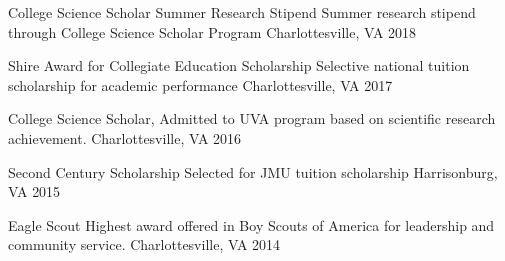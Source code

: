 \begin{cvhonors}
  \cvhonor
    { College Science Scholar Summer Research Stipend} %
    {Summer research stipend through College Science Scholar Program} %
    {Charlottesville, VA} %
    {2018} %
    
  \cvhonor
    {Shire Award for Collegiate Education Scholarship} %
    {Selective national tuition scholarship for academic performance} %
    {Charlottesville, VA} %
    {2017} %

  \cvhonor
    {College Science Scholar,} %
    {Admitted to UVA program based on scientific research achievement.} %
    {Charlottesville, VA} %
    {2016} %

  \cvhonor
    {Second Century Scholarship} %
    {Selected for JMU tuition scholarship} %
    {Harrisonburg, VA} %
    {2015} %
    
  \cvhonor
    {Eagle Scout} %
    {Highest award offered in Boy Scouts of America for leadership and community service.} %
    {Charlottesville, VA} %
    {2014} %


\end{cvhonors}






